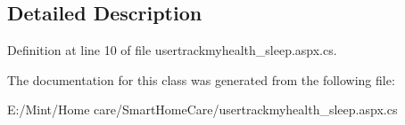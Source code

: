 \subsection{Detailed Description}


Definition at line 10 of file usertrackmyhealth\-\_\-sleep.\-aspx.\-cs.



The documentation for this class was generated from the following file\-:\begin{DoxyCompactItemize}
\item 
E\-:/\-Mint/\-Home care/\-Smart\-Home\-Care/usertrackmyhealth\-\_\-sleep.\-aspx.\-cs\end{DoxyCompactItemize}
